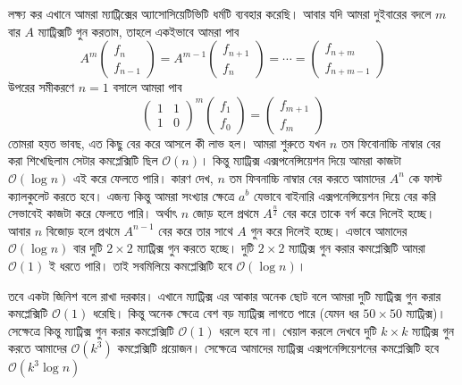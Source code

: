 লক্ষ্য কর এখানে আমরা ম্যাট্রিক্সের অ্যাসোসিয়েটিভিটি ধর্মটি ব্যবহার করেছি। আবার যদি আমরা দুইবারের বদলে $m$ বার $A$ ম্যাট্রিক্সটি গুন করতাম, তাহলে  একইভাবে আমরা পাব 
$$
A^m
\begin{pmatrix}
f_{n} \\
f_{n - 1}
\end{pmatrix}
= 
A^{m-1}
\begin{pmatrix}
f_{n + 1} \\
f_{n}
\end{pmatrix}
= \cdots =
\begin{pmatrix}
f_{n + m} \\
f_{n + m - 1}
\end{pmatrix}
$$ 
উপরের সমীকরণে $n = 1$ বসালে আমরা পাব 
$$
\begin{pmatrix}
1 & 1 \\
1 & 0
\end{pmatrix} ^ {m}
\begin{pmatrix}
f_{1} \\
f_{0}
\end{pmatrix}
= 
\begin{pmatrix}
f_{m + 1} \\
f_{m}
\end{pmatrix}
$$ 
তোমরা হয়ত ভাবছ, এত কিছু বের করে আসলে কী লাভ হল। আমরা শুরুতে যখন $n$ তম ফিবোনাচ্চি নাম্বার বের করা শিখেছিলাম সেটার কমপ্লেক্সিটি ছিল $\mathcal{O}(n)$।  কিন্তু ম্যাট্রিক্স এক্সপনেন্সিয়েশন দিয়ে আমরা কাজটা $\mathcal{O}(\log{n})$ এই করে ফেলতে পারি। কারণ দেখ, $n$ তম ফিবনাচ্চি নাম্বার বের করতে আমাদের $A^{n}$ কে ফাস্ট ক্যালকুলেট করতে হবে। এজন্য কিন্তু আমরা সংখ্যার ক্ষেত্রে $a^b$ যেভাবে বাইনারি  এক্সপনেন্সিয়েশন দিয়ে বের করি সেভাবেই কাজটা করে ফেলতে পারি। অর্থাৎ $n$ জোড় হলে প্রথমে $A^{\frac{n}{2}}$ বের করে তাকে বর্গ করে দিলেই হচ্ছে। আবার $n$ বিজোড় হলে প্রথমে $A^{n - 1}$ বের করে তার সাথে $A$ গুন করে দিলেই হচ্ছে। এভাবে আমাদের $\mathcal{O}(\log{n})$ বার দুটি $2 \times 2$ ম্যাট্রিক্স গুন করতে হচ্ছে। দুটি $2 \times 2$ ম্যাট্রিক্স গুন করার কমপ্লেক্সিটি আমরা $\mathcal{O}(1)$ ই ধরতে পারি। তাই সবমিলিয়ে কমপ্লেক্সিটি হবে $\mathcal{O}(\log{n})$। 

তবে একটা জিনিশ বলে রাখা দরকার। এখানে ম্যাট্রিক্স এর আকার অনেক ছোট বলে আমরা দুটি ম্যাট্রিক্স গুন করার কমপ্লেক্সিটি $\mathcal{O}(1)$ ধরেছি। কিন্তু অনেক ক্ষেত্রে বেশ বড় ম্যাট্রিক্স লাগতে পারে (যেমন ধর $50 \times 50$ ম্যাট্রিক্স)। সেক্ষেত্রে কিন্তু ম্যাট্রিক্স গুন করার কমপ্লেক্সিটি $\mathcal{O}(1)$ ধরলে হবে না। খেয়াল করলে দেখবে দুটি $k \times k$ ম্যাট্রিক্স গুন করতে আমাদের $\mathcal{O}(k^3)$ কমপ্লেক্সিটি প্রয়োজন। সেক্ষেত্রে আমাদের ম্যাট্রিক্স এক্সপনেন্সিয়েশনের কমপ্লেক্সিটি হবে $\mathcal{O}(k^{3} \log{n})$

